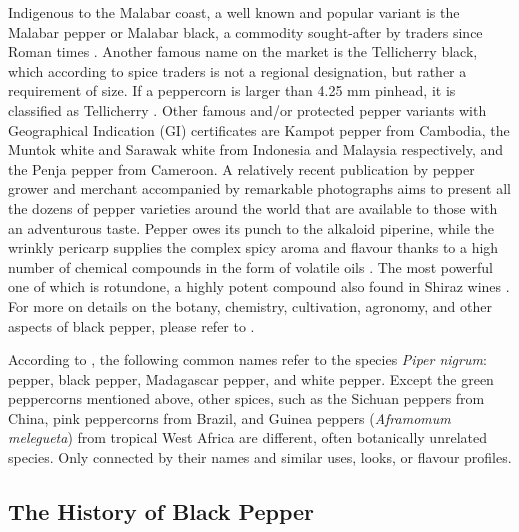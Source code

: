 Indigenous to the Malabar coast, a well known and popular variant is the Malabar pepper or Malabar black, a commodity sought-after by traders since Roman times \autocite{de_romanis_indo-roman_2020}. Another famous name on the market is the Tellicherry black, which according to spice traders is not a regional designation, but rather a requirement of size. If a peppercorn is larger than 4.25 mm pinhead, it is classified as Tellicherry \autocite{eirinberg_tellicherry_2021}. Other famous and/or protected pepper variants with Geographical Indication (GI) certificates are Kampot pepper from Cambodia, the Muntok white and Sarawak white from Indonesia and Malaysia respectively, and the Penja pepper from Cameroon. A relatively recent publication by pepper grower and merchant \textcite{de_kerros_pepper_2016} accompanied by remarkable photographs aims to present all the dozens of pepper varieties around the world that are available to those with an adventurous taste.
Pepper owes its punch to the alkaloid piperine, while the wrinkly pericarp supplies the complex spicy aroma and flavour thanks to a high number of chemical compounds in the form of volatile oils \autocite[467]{ravindran_black_2000}. The most powerful one of which is rotundone, a highly potent compound also found in Shiraz wines \autocite{wood_wine_2008}. For more on details on the botany, chemistry, cultivation, agronomy, and other aspects of black pepper, please refer to \textcite{ravindran_black_2000, nair_agronomy_2011, parthasarathy_chemistry_2008}.

According to \textcite[695]{mabberley_mabberleys_2017}, the following common names refer to the species \textit{Piper nigrum}: pepper, black pepper, Madagascar pepper, and white pepper. Except the green peppercorns mentioned above, other spices, such as the Sichuan peppers from China, pink peppercorns from Brazil, and Guinea peppers (\textit{Aframomum melegueta}) from tropical West Africa are different, often botanically unrelated species. Only connected by their names and similar uses, looks, or flavour profiles.

\subsection{The History of Black Pepper}

